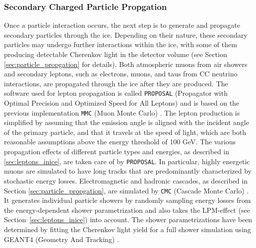 \subsubsection*{Secondary Charged Particle Propgation}
Once a particle interaction occurs, the next step is to generate and propagate secondary particles through the ice. Depending on their nature, these secondary particles may undergo further interactions within the ice, with some of them producing detectable Cherenkov light in the detector volume (see Section \ref{sec:particle_propgation} for details). Both atmospheric muons from air showers and secondary leptons, such as electrons, muons, and taus from CC neutrino interactions, are propagated through the ice after they are produced. The software used for lepton propagation is called \texttt{PROPOSAL} (Propagator with Optimal Precision and Optimized Speed for All Leptons)  and is based on the previous implementation \texttt{MMC} (Muon Monte Carlo) . The lepton production is simplified by assuming that the emission angle is aligned with the incident angle of the primary particle, and that it travels at the speed of light, which are both reasonable assumptions above the energy threshold of 100 GeV. The various propagation effects of different particle types and energies, as described in \ref{sec:leptons_inice}, are taken care of by \texttt{PROPOSAL}. In particular, highly energetic muons are simulated to have long tracks that are predominantly characterized by stochastic energy losses. Electromagnetic and hadronic cascades, as described in Section \ref{sec:particle_propgation}, are simulated by \texttt{CMC} (Cascade Monte Carlo) . It generates individual particle showers by randomly sampling energy losses from the energy-dependent shower parametrization and also takes the LPM-effect (see Section~\ref{sec:leptons_inice}) into account. The shower parametrizations have been determined by fitting the Cherenkov light yield for a full shower simulation using GEANT4 (Geometry And Tracking) .

